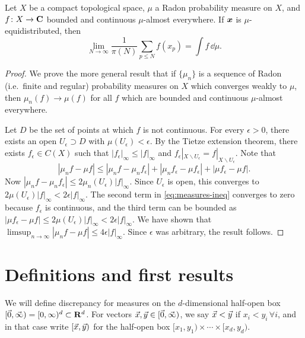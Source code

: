 \begin{theorem}
Let $X$ be a compact topological space, $\mu$ a Radon probability measure on 
$X$, and $f\colon X\to \mathbf{C}$ bounded and continuous $\mu$-almost everywhere. If 
${\boldsymbol x}$ is $\mu$-equidistributed, then 
\[
	\lim_{N\to \infty} \frac{1}{\pi(N)} \sum_{p\leqslant N} f(x_p) = \int f\, \dd\mu .
\]
\end{theorem}
\begin{proof}
We prove the more general result that if $\{\mu_n\}$ is a sequence of Radon 
(i.e.~finite and regular)
probability measures on $X$ which converges weakly to $\mu$, then 
$\mu_n(f) \to \mu(f)$ for all $f$ which are bounded and continuous 
$\mu$-almost everywhere. 

Let $D$ be the set of points at which $f$ is not continuous. For every 
$\epsilon>0$, there exists an open $U_\epsilon\supset D$ with 
$\mu(U_\epsilon) < \epsilon$. By the Tietze extension theorem, there exists 
$f_\epsilon\in C(X)$ such that $|f_\epsilon|_\infty \leqslant |f|_\infty$ and 
$f_\epsilon|_{X\smallsetminus U_\epsilon} = f|_{X\smallsetminus U_\epsilon}$. 
Note that 
\begin{equation}\label{eq:measures-ineq}
	|\mu_n f - \mu f| \leqslant |\mu_n f - \mu_n f_\epsilon| + |\mu_n f_\epsilon - \mu f_\epsilon| + |\mu f_\epsilon - \mu f| .
\end{equation}
Now $|\mu_n f - \mu_n f_\epsilon| \leqslant 2\mu_n(U_\epsilon) |f|_\infty$. Since 
$U_\epsilon$ is open, this converges to 
$2\mu(U_\epsilon) |f|_\infty < 2\epsilon |f|_\infty$. The second term in 
\eqref{eq:measures-ineq} converges to zero because $f_\epsilon$ is continuous, 
and the third term can be bounded as 
$|\mu f_\epsilon - \mu f| \leqslant 2\mu(U_\epsilon) |f|_\infty < 2\epsilon |f|_\infty$. 
We have shown that 
$\limsup_{n\to \infty} |\mu_n f - \mu f| \leqslant 4 \epsilon |f|_\infty$. 
Since $\epsilon$ was arbitrary, the result follows. 
\end{proof}





\section{Definitions and first results}

We will define discrepancy for measures on the $d$-dimensional half-open box 
$[\vec{0},\vec{\infty}) = [0,\infty)^d\subset \mathbf{R}^d$. For vectors 
$\vec{x},\vec{y}\in [\vec{0},\vec{\infty})$, we say $\vec{x}<\vec{y}$ if $x_i<y_i\,\forall i$, and 
in that case write $[\vec{x},\vec{y})$ for the half-open box 
$[x_1,y_1)\times \cdots \times [x_d,y_d)$. 

